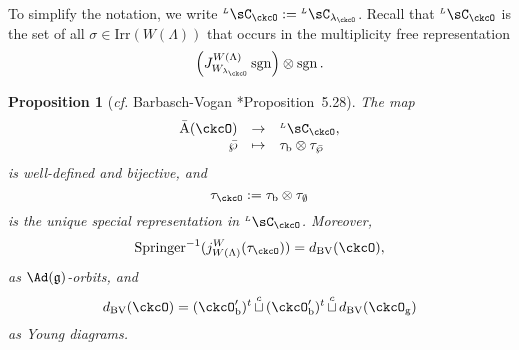 \documentclass[12pt]{amsart}
\newcommand{\sgn}{\operatorname{sgn}}
\newcommand{\g}{\mathfrak g}
\numberwithin{equation}{section}
\newtheorem{prop}[thm]{Proposition}
\theoremstyle{remark}
\def\half{{\tfrac{1}{2}}}
\def\cf{\emph{cf.} }
\def\Irr{\mathrm{Irr}}
\def\dBV{d_{\mathrm{BV}}}
\def\lamck{\lambda_\ckcO}
\def\WLamck{W_{[\lambda_{\ckcO}]}}
\def\Wlamck{W_{\lamck}}
\def\LC{{}^{\scriptscriptstyle L}\sC}
\def\cupcol{{\stackrel{c}{\sqcup}}}
\def\Spr{\mathrm{Springer}}
\def\imathp{\imath_{\wp}}
\def\jmathp{\jmath_{\wp}}
\def\cupcol{{\,\stackrel{c}{\sqcup}\,}}
\def\ckcOpb{\ckcO'_{\mathrm b}}
\def\ckcOg{\ckcO_{\mathrm g}}
\begin{document}
  To simplify the notation, we write $\LC_{\ckcO}:= \LC_{\lambda_{\ckcO}}$. Recall that $\LC_{\ckcO}$ is the set of all $\sigma\in \Irr(W(\Lambda))$  that occurs in the multiplicity free representation
   \[
    \left(J_{\Wlamck}^{W(\Lambda)} \sgn\right) \otimes \sgn.
  \]

\begin{prop}[\cf Barbasch-Vogan {\cite{BVUni}*{Proposition~5.28}}]
    \label{lem:Lcell}
    The
  map    \[
      \begin{array}{rcl}
        \bar{\mathrm A}(\ckcO) & \rightarrow & \LC_{\ckcO},\\
                       \bar \wp & \mapsto &  \tau_{\mathrm b} \otimes \tau_{\bar \wp}
      \end{array}
    \]
    is well-defined and bijective, and
        \[
      \tau_{\ckcO}:=\tau_{\mathrm b}\otimes \tau_{\emptyset}
    \] is the unique special representation in $\LC_{\ckcO}$.
 Moreover,
    \begin{equation}\label{eq:dBV.W}
      \Spr ^{-1}(j_{W(\Lambda)}^{W}(\tau_{\ckcO}))
      = \dBV(\ckcO),
       \end{equation}
    as $\Ad(\g)$-orbits,
    and
  \begin{equation}\label{eq:dBV.W2}
     \dBV(\ckcO)=   (\ckcOpb)^{t} \cupcol (\ckcOpb)^{t}\cupcol \dBV(\ckcOg)
   \end{equation}
as Young diagrams.
 \end{prop}

\end{document}
